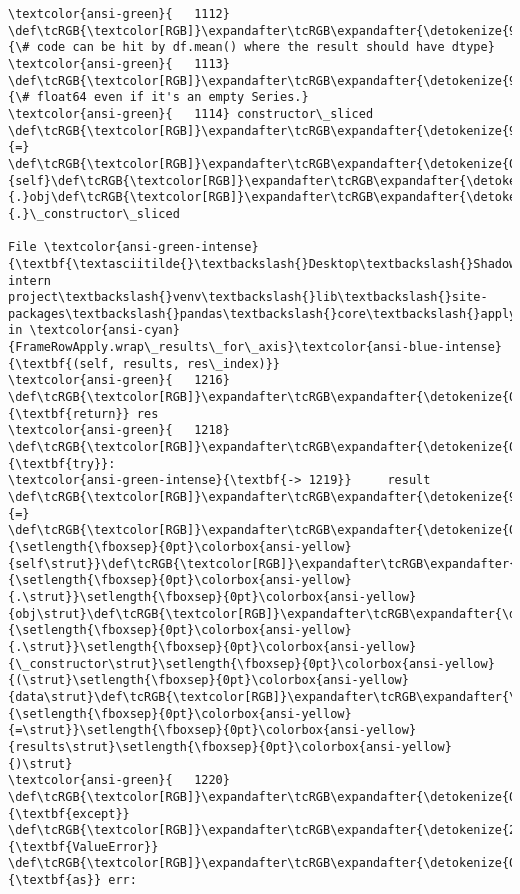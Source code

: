 \documentclass[11pt]{article}
\begin{document}
\begin{Verbatim}[commandchars=\\\{\}, frame=single, framerule=2mm, rulecolor=\color{outerrorbackground}]
\textcolor{ansi-green}{   1112} \def\tcRGB{\textcolor[RGB]}\expandafter\tcRGB\expandafter{\detokenize{95,135,135}}{\# code can be hit by df.mean() where the result should have dtype}
\textcolor{ansi-green}{   1113} \def\tcRGB{\textcolor[RGB]}\expandafter\tcRGB\expandafter{\detokenize{95,135,135}}{\# float64 even if it's an empty Series.}
\textcolor{ansi-green}{   1114} constructor\_sliced \def\tcRGB{\textcolor[RGB]}\expandafter\tcRGB\expandafter{\detokenize{98,98,98}}{=} \def\tcRGB{\textcolor[RGB]}\expandafter\tcRGB\expandafter{\detokenize{0,135,0}}{self}\def\tcRGB{\textcolor[RGB]}\expandafter\tcRGB\expandafter{\detokenize{98,98,98}}{.}obj\def\tcRGB{\textcolor[RGB]}\expandafter\tcRGB\expandafter{\detokenize{98,98,98}}{.}\_constructor\_sliced

File \textcolor{ansi-green-intense}{\textbf{\textasciitilde{}\textbackslash{}Desktop\textbackslash{}Shadowfox intern project\textbackslash{}venv\textbackslash{}lib\textbackslash{}site-packages\textbackslash{}pandas\textbackslash{}core\textbackslash{}apply.py:1219}}, in \textcolor{ansi-cyan}{FrameRowApply.wrap\_results\_for\_axis}\textcolor{ansi-blue-intense}{\textbf{(self, results, res\_index)}}
\textcolor{ansi-green}{   1216}     \def\tcRGB{\textcolor[RGB]}\expandafter\tcRGB\expandafter{\detokenize{0,135,0}}{\textbf{return}} res
\textcolor{ansi-green}{   1218} \def\tcRGB{\textcolor[RGB]}\expandafter\tcRGB\expandafter{\detokenize{0,135,0}}{\textbf{try}}:
\textcolor{ansi-green-intense}{\textbf{-> 1219}}     result \def\tcRGB{\textcolor[RGB]}\expandafter\tcRGB\expandafter{\detokenize{98,98,98}}{=} \def\tcRGB{\textcolor[RGB]}\expandafter\tcRGB\expandafter{\detokenize{0,135,0}}{\setlength{\fboxsep}{0pt}\colorbox{ansi-yellow}{self\strut}}\def\tcRGB{\textcolor[RGB]}\expandafter\tcRGB\expandafter{\detokenize{98,98,98}}{\setlength{\fboxsep}{0pt}\colorbox{ansi-yellow}{.\strut}}\setlength{\fboxsep}{0pt}\colorbox{ansi-yellow}{obj\strut}\def\tcRGB{\textcolor[RGB]}\expandafter\tcRGB\expandafter{\detokenize{98,98,98}}{\setlength{\fboxsep}{0pt}\colorbox{ansi-yellow}{.\strut}}\setlength{\fboxsep}{0pt}\colorbox{ansi-yellow}{\_constructor\strut}\setlength{\fboxsep}{0pt}\colorbox{ansi-yellow}{(\strut}\setlength{\fboxsep}{0pt}\colorbox{ansi-yellow}{data\strut}\def\tcRGB{\textcolor[RGB]}\expandafter\tcRGB\expandafter{\detokenize{98,98,98}}{\setlength{\fboxsep}{0pt}\colorbox{ansi-yellow}{=\strut}}\setlength{\fboxsep}{0pt}\colorbox{ansi-yellow}{results\strut}\setlength{\fboxsep}{0pt}\colorbox{ansi-yellow}{)\strut}
\textcolor{ansi-green}{   1220} \def\tcRGB{\textcolor[RGB]}\expandafter\tcRGB\expandafter{\detokenize{0,135,0}}{\textbf{except}} \def\tcRGB{\textcolor[RGB]}\expandafter\tcRGB\expandafter{\detokenize{215,95,95}}{\textbf{ValueError}} \def\tcRGB{\textcolor[RGB]}\expandafter\tcRGB\expandafter{\detokenize{0,135,0}}{\textbf{as}} err:

\end{Verbatim}
\end{document}
